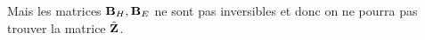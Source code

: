   Mais les matrices \(\mathbf{B}_{H}, \mathbf{B}_E\) ne sont pas inversibles et donc on ne pourra pas trouver la matrice \(\hat{\mathbf{Z}}\).








